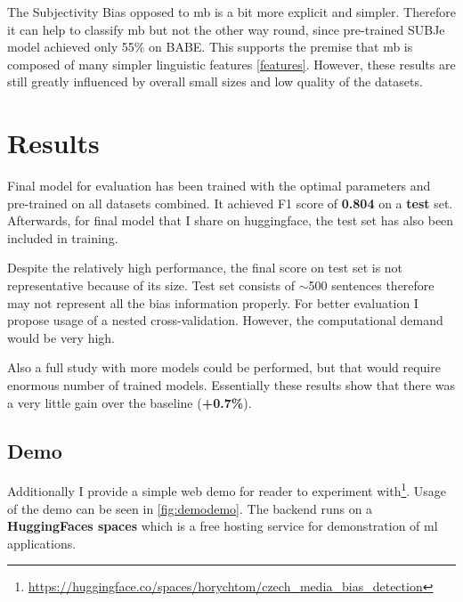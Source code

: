 The Subjectivity Bias opposed to \gls{mb} is a bit more explicit and simpler. Therefore it can help to classify \gls{mb} but not the other way round, since pre-trained SUBJe model achieved only 55\% on BABE. This supports the premise that \gls{mb} is composed of many simpler linguistic features \ref{features}. However, these results are still greatly influenced by overall small sizes and low quality of the datasets.




\section{Results}
Final model for evaluation has been trained with the optimal parameters and pre-trained on all datasets combined. It achieved F1 score of \textbf{0.804} on a \textbf{test} set. Afterwards, for final model that I share on huggingface, the test set has also been included in training.


Despite the relatively high performance, the final score on test set is not representative because of its size. Test set consists of $\sim$500 sentences therefore may not represent all the bias information properly. For better evaluation I propose usage of a nested cross-validation. However, the computational demand would be very high. 

Also a full study with more models could be performed, but that would require enormous number of trained models. Essentially these results show that there was a very little gain over the baseline (\textbf{+0.7\%}).

\begin{figure}
\end{figure}


\subsection{Demo}
Additionally I provide a simple web demo for reader to experiment with\footnote{\url{https://huggingface.co/spaces/horychtom/czech_media_bias_detection}}. Usage of the demo can be seen in \ref{fig:demodemo}. The backend runs on a \textbf{HuggingFaces spaces} which is a free hosting service for demonstration of \gls{ml} applications. 

